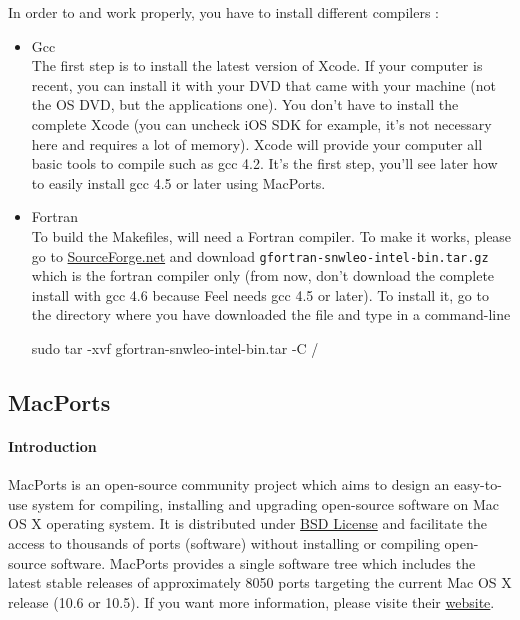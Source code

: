 In order to \feel and \cmake work properly, you have to install different compilers :
\begin{itemize}
\item Gcc \\
  The first step is to install the latest version of Xcode. If your computer is
  recent, you can install it with your DVD that came with your machine (not the
  OS DVD, but the applications one). You don't have to install the complete
  Xcode (you can uncheck iOS SDK for example, it's not necessary here and
  requires a lot of memory). Xcode will provide your computer all basic tools to
  compile such as gcc 4.2. It's the first step, you'll see later how to easily
  install gcc 4.5 or later using MacPorts.
\item Fortran \\
  To build the Makefiles, \cmake will need a Fortran compiler. To make it works,
  please go to \href{http://hpc.sourceforge.net/}{SourceForge.net} and download
  \lstinline|gfortran-snwleo-intel-bin.tar.gz| which is the fortran compiler
  only (from now, don't download the complete install with gcc 4.6 because Feel
  needs gcc 4.5 or later). To install it, go to the directory where you have
  downloaded the file and type in a command-line
\begin{unixcom}
		sudo tar -xvf gfortran-snwleo-intel-bin.tar -C /
\end{unixcom}

\end{itemize}

\subsection{MacPorts}

\paragraph{Introduction}
MacPorts is an open-source community project which aims to design an easy-to-use
system for compiling, installing and upgrading open-source software on Mac OS X
operating system. It is distributed under
\href{http://opensource.org/licenses/bsd-license.php}{BSD License} and
facilitate the access to thousands of ports (software) without installing or
compiling open-source software.  MacPorts provides a single software tree which
includes the latest stable releases of approximately 8050 ports targeting the
current Mac OS X release (10.6 or 10.5). If you want more information, please
visite their \href{http://www.macports.org/}{website}.

